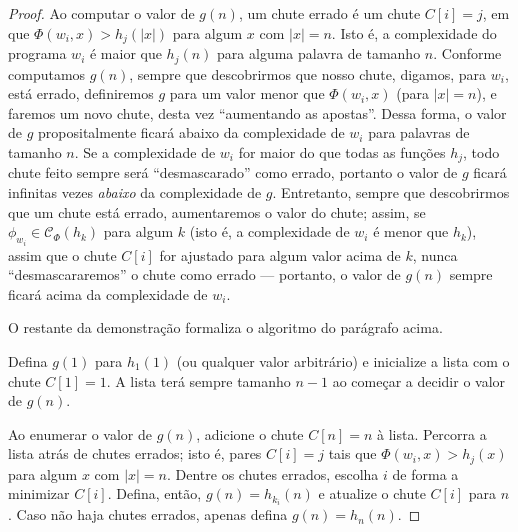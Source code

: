 \begin{proof}
    Ao computar o valor de $g(n)$,
    um chute errado
    é um chute $C[i] = j$,
    em que $\Phi(w_i, x) > h_j(|x|)$
    para algum $x$ com $|x| = n$.
    Isto é,
    a complexidade do programa $w_i$
    é maior que $h_j(n)$ para alguma palavra de tamanho $n$.
    Conforme computamos $g(n)$,
    sempre que descobrirmos que nosso chute,
    digamos, para $w_i$, está errado,
    definiremos $g$ para um valor menor que $\Phi(w_i, x)$
    (para $|x| = n$),
    e faremos um novo chute,
    desta vez ``aumentando as apostas''.
    Dessa forma, o valor de $g$ propositalmente ficará abaixo
    da complexidade de $w_i$ para palavras de tamanho $n$.
    Se a complexidade de $w_i$ for maior do que todas as funções $h_j$,
    todo chute feito sempre será ``desmascarado'' como errado,
    portanto o valor de $g$ ficará infinitas vezes
    \emph{abaixo} da complexidade de $g$.
    Entretanto,
    sempre que descobrirmos que um chute está errado,
    aumentaremos o valor do chute;
    assim,
    se $\phi_{w_i} \in \mathcal C_\Phi(h_k)$ para algum $k$
    (isto é, a complexidade de $w_i$ é menor que $h_k$),
    assim que o chute $C[i]$ for ajustado para algum valor acima de $k$,
    nunca ``desmascararemos'' o chute como errado
    --- portanto, o valor de $g(n)$ sempre ficará acima da complexidade de $w_i$.

    O restante da demonstração formaliza o algoritmo do parágrafo acima.

    Defina $g(1)$ para $h_1(1)$
    (ou qualquer valor arbitrário)
    e inicialize a lista com o chute
    $C[1] = 1$.
    A lista terá sempre tamanho $n-1$
    ao começar a decidir o valor de $g(n)$.

    Ao enumerar o valor de $g(n)$,
    adicione o chute $C[n] = n$ à lista.
    Percorra a lista atrás de chutes errados;
    isto é,
    pares $C[i] = j$
    tais que $\Phi(w_i, x) > h_j(x)$
    para algum $x$ com $|x| = n$.
    Dentre os chutes errados,
    escolha $i$ de forma a minimizar $C[i]$.
    Defina, então, $g(n) = h_{k_i}(n)$
    e atualize o chute $C[i]$ para $n$.
    Caso não haja chutes errados,
    apenas defina $g(n) = h_n(n)$.


\end{proof}

